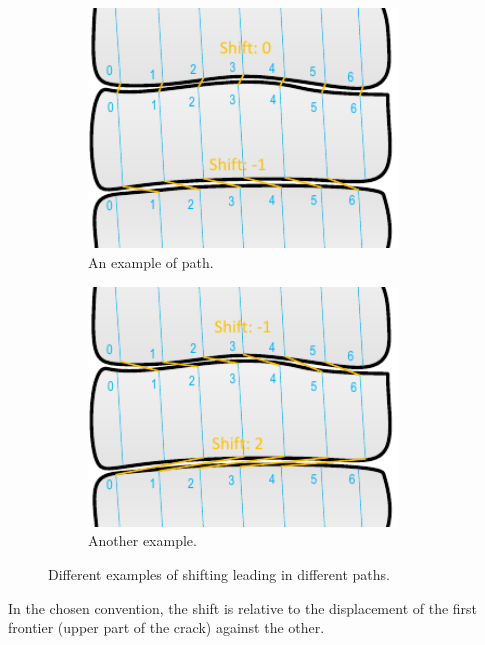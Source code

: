 \begin{figure}[!ht]
\centering
    \begin{subfigure}[t]{0.45\textwidth}
    \centering
    \includegraphics[width=0.9\textwidth]{images/matching-shift-ex-1}
    \caption{An example of path.}
    \label{fig:shiftingex1}
    \end{subfigure}
    \begin{subfigure}[t]{0.45\textwidth}
    \centering
    \includegraphics[width=0.9\textwidth]{images/matching-shift-ex-2}
    \caption{Another example.}
    \label{fig:shiftingex2}
    \end{subfigure}
    \caption{Different examples of shifting leading in different paths.}
    \label{fig:matchshiftingex}
\end{figure}

In the chosen convention, the shift is relative to the displacement of the first frontier (upper part of the crack) against the other. 

